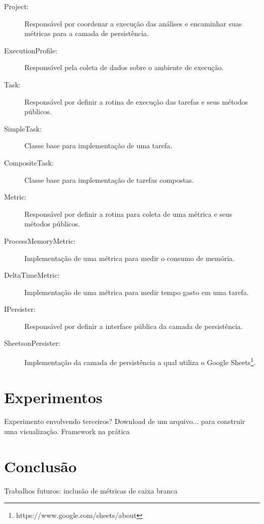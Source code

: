 \documentclass[12pt]{tcc}
\begin{document}
\begin{description}
	\item[Project:] Responsável por coordenar a execução das análises e encaminhar suas métricas para a camada de persistência.
	\item[ExecutionProfile:] Responsável pela coleta de dados sobre o ambiente de execução.
	\item[Task:] Responsável por definir a rotina de execução das tarefas e seus métodos públicos.
	\item[SimpleTask:] Classe base para implementação de uma tarefa.
	\item[CompositeTask:] Classe base para implementação de tarefas compostas.
	\item[Metric:] Responsável por definir a rotina para coleta de uma métrica e seus métodos públicos.
	\item[ProcessMemoryMetric:] Implementação de uma métrica para medir o consumo de memória.
	\item[DeltaTimeMetric:] Implementação de uma métrica para medir tempo gasto em uma tarefa.
	\item[IPersister:] Responsável por definir a interface pública da camada de persistência.
	\item[SheetsonPersister:] Implementação da camada de persistência a qual utiliza o Google Sheets\footnote{https://www.google.com/sheets/about}.
\end{description}


\chapter{Experimentos}
\label{cap:experimentos}

Experimento envolvendo terceiros? Download de um arquivo... para construir uma visualização.
Framework na prática


\chapter{Conclusão}
\label{cap:conclusão}

Trabalhos futuros: inclusão de métricas de caixa branca

\label{bibpage}
\renewcommand\bibname{Referências}

%

\label{bibfinalpage}

\label{lastpage}
\end{document}
